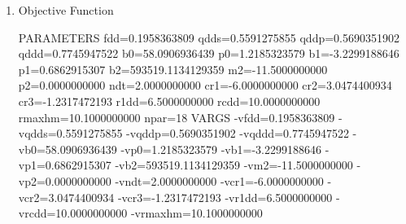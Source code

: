 \documentclass[11pt]{article}
\begin{document}
\begin{enumerate}
\item Objective Function
\label{sec:orgd2e96ba}


PARAMETERS
  fdd=0.1958363809 qdds=0.5591275855 qddp=0.5690351902 qddd=0.7745947522 b0=58.0906936439 p0=1.2185323579 b1=-3.2299188646 p1=0.6862915307 b2=593519.1134129359 m2=-11.5000000000 p2=0.0000000000 ndt=2.0000000000 cr1=-6.0000000000 cr2=3.0474400934 cr3=-1.2317472193 r1dd=6.5000000000 rcdd=10.0000000000 rmaxhm=10.1000000000 npar=18 
VARGS
    -vfdd=0.1958363809 -vqdds=0.5591275855 -vqddp=0.5690351902 -vqddd=0.7745947522 -vb0=58.0906936439 -vp0=1.2185323579 -vb1=-3.2299188646 -vp1=0.6862915307 -vb2=593519.1134129359 -vm2=-11.5000000000 -vp2=0.0000000000 -vndt=2.0000000000 -vcr1=-6.0000000000 -vcr2=3.0474400934 -vcr3=-1.2317472193 -vr1dd=6.5000000000 -vrcdd=10.0000000000 -vrmaxhm=10.1000000000 


\end{enumerate}
\end{document}
